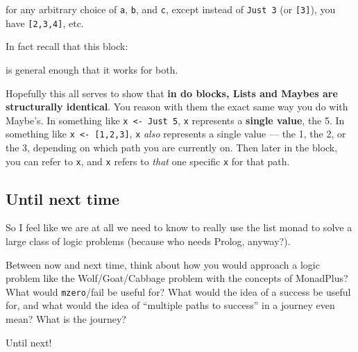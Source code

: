 \documentclass[]{article}
\newenvironment{Shaded}{}{}
\newcommand{\KeywordTok}[1]{\textcolor[rgb]{0.00,0.44,0.13}{\textbf{{#1}}}}
\newcommand{\DataTypeTok}[1]{\textcolor[rgb]{0.56,0.13,0.00}{{#1}}}
\newcommand{\DecValTok}[1]{\textcolor[rgb]{0.25,0.63,0.44}{{#1}}}
\newcommand{\OtherTok}[1]{\textcolor[rgb]{0.00,0.44,0.13}{{#1}}}
\newcommand{\FunctionTok}[1]{\textcolor[rgb]{0.02,0.16,0.49}{{#1}}}
\newcommand{\NormalTok}[1]{{#1}}
\begin{document}
\begin{Shaded}
\end{Shaded}

for any arbitrary choice of \texttt{a}, \texttt{b}, and \texttt{c},
except instead of \texttt{Just\ 3} (or \texttt{{[}3{]}}), you have
\texttt{{[}2,3,4{]}}, etc.

In fact recall that this block:

\begin{Shaded}
\end{Shaded}

is general enough that it works for both.

Hopefully this all serves to show that \textbf{in do blocks, Lists and
Maybes are structurally identical}. You reason with them the exact same
way you do with Maybe's. In something like
\texttt{x\ \textless{}-\ Just\ 5}, \texttt{x} represents a
\textbf{single value}, the 5. In something like
\texttt{x\ \textless{}-\ {[}1,2,3{]}}, \texttt{x} \emph{also} represents
a single value --- the 1, the 2, or the 3, depending on which path you
are currently on. Then later in the block, you can refer to \texttt{x},
and \texttt{x} refers to \emph{that} one specific \texttt{x} for that
path.

\subsection{Until next time}\label{until-next-time}

So I feel like we are at all we need to know to really use the list
monad to solve a large class of logic problems (because who needs
Prolog, anyway?).

Between now and next time, think about how you would approach a logic
problem like the Wolf/Goat/Cabbage problem with the concepts of
MonadPlus? What would \texttt{mzero}/fail be useful for? What would the
idea of a success be useful for, and what would the idea of ``multiple
paths to success'' in a journey even mean? What is the journey?

Until next!
\end{document}
